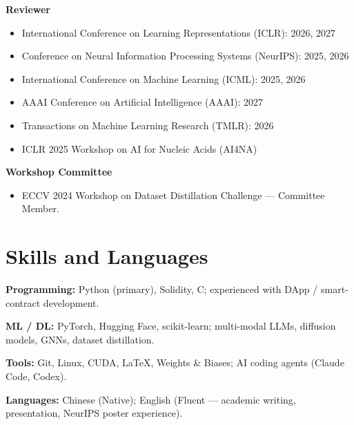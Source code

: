 \documentclass[10pt,a4paper]{article}
\begin{document}
\vspace{2pt}
\noindent\textbf{Reviewer}
\begin{itemize}
  \item International Conference on Learning Representations (ICLR): 2026, 2027
  \item Conference on Neural Information Processing Systems (NeurIPS): 2025, 2026
  \item International Conference on Machine Learning (ICML): 2025, 2026
  \item AAAI Conference on Artificial Intelligence (AAAI): 2027
  \item Transactions on Machine Learning Research (TMLR): 2026
  \item ICLR 2025 Workshop on AI for Nucleic Acids (AI4NA)
\end{itemize}

\vspace{2pt}
\noindent\textbf{Workshop Committee}
\begin{itemize}
  \item ECCV 2024 Workshop on Dataset Distillation Challenge --- Committee Member.
\end{itemize}

\section*{Skills and Languages}

\noindent\textbf{Programming:} Python (primary), Solidity, C; experienced with DApp / smart-contract development.\par
\textbf{ML / DL:} PyTorch, Hugging Face, scikit-learn; multi-modal LLMs, diffusion models, GNNs, dataset distillation.\par
\textbf{Tools:} Git, Linux, CUDA, LaTeX, Weights \& Biases; AI coding agents (Claude Code, Codex).\par
\textbf{Languages:} Chinese (Native); English (Fluent --- academic writing, presentation, NeurIPS poster experience).
\end{document}
